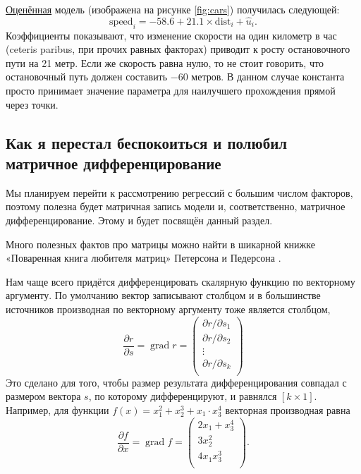 \documentclass[12pt]{article}
\DeclareMathOperator{\grad}{grad}
\newcommand{\hu}{\hat{u}}
\begin{document}
\href{https://colab.research.google.com/drive/1ZQ7QuVCJS4I_GsXUrr7z7O-3wqXkXSMN?usp=sharing}{Оценённая} модель (изображена на рисунке \ref{fig:cars}) получилась следующей: 
\[
\text{speed}_i = -58.6 + 21.1 \times \text{dist}_i + \hu_i.
\]
Коэффициенты показывают, что изменение скорости на один километр в час (ceteris paribus, при прочих равных факторах) приводит к росту остановочного пути на 21 метр. 
Если же скорость равна нулю, то не стоит говорить, что остановочный путь должен составить $-60$ метров.
В данном случае константа просто принимает значение параметра для наилучшего прохождения прямой через точки.

\subsection{Как я перестал беспокоиться и полюбил матричное дифференцирование}

Мы планируем перейти к рассмотрению регрессий с большим числом факторов, поэтому полезна будет матричная запись модели и, соответственно, матричное дифференцирование. 
Этому и будет посвящён данный раздел.

Много полезных фактов про матрицы можно найти в шикарной книжке «Поваренная книга любителя матриц» Петерсона и Педерсона \cite{petersen2012matrix}.


Нам чаще всего придётся дифференцировать скалярную функцию по векторному аргументу. 
По умолчанию вектор записывают столбцом и в большинстве источников производная по векторному аргументу тоже является столбцом,
\[
\frac{\partial r}{\partial s} = \grad r = \begin{pmatrix}
    \partial r/\partial s_1 \\
    \partial r/\partial s_2 \\
    \vdots \\
    \partial r/\partial s_k \\    
\end{pmatrix}
\]
Это сделано для того, чтобы размер результата дифференцирования совпадал с размером вектора $s$, по которому дифференцируют, и равнялся $[k \times 1]$. 
Например, для функции $f(x) = x_1^2 + x_2^3 + x_1 \cdot x_3^4$ векторная производная равна
\[
\frac{\partial f}{\partial x} = \grad f = \begin{pmatrix}
    2x_1 + x_3^4\\
    3x_2^2 \\
    4x_1 x_3^3 \\
\end{pmatrix}.
\]
\end{document}

